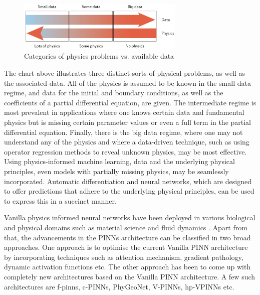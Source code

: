 \documentclass[conference,compsoc]{IEEEtran}
\begin{document}
\begin{figure}[h]
    \centering
    \includegraphics[scale=0.5,width = 8cm]{figures/data_vs_physics.JPG}
    \caption{Categories of physics problems vs. available data\cite{karniadakis2021physics}}
\end{figure}

The chart above illustrates three distinct sorts of physical problems, as well as the associated data\cite{karniadakis2021physics}.
All of the physics is assumed to be known in the small data regime, and data for the initial and boundary conditions, as well as the coefficients of a partial differential equation, are given.
The intermediate regime is most prevalent in applications where one knows certain data and fundamental physics but is missing certain parameter values or even a full term in the partial differential equation\cite{raissi2019physics}. Finally, there is the big data regime, where one may not understand any of the physics and where a data-driven technique, such as using operator regression methods to reveal unknown physics, may be most effective\cite{karniadakis2021physics}. Using physics-informed machine learning, data and the underlying physical principles, even models with partially missing physics, may be seamlessly incorporated\cite{cai2021physics}\cite{karniadakis2021physics}. Automatic differentiation and neural networks, which are designed to offer predictions that adhere to the underlying physical principles, can be used to express this in a succinct manner\cite{raissi2019physics}. 

Vanilla physics informed neural networks have been deployed in various biological and physical domains such as material science and fluid dynamics \cite{cai2021physics}\cite{tipireddy2019comparative}\cite{erichson2019physics}\cite{reyes2021learning}\cite{tartakovsky2020physics}. Apart from that, the advancements in the PINNs architecture can be classified in two broad approaches. One approach is to optimise the current Vanilla PINN architecture by incorporating techniques such as attention mechanism, gradient pathology\cite{wang2020understanding}\cite{hospedales2020meta}, dynamic activation functions etc\cite{jagtap2020locally}\cite{jagtap2020adaptive}\cite{elsken2019neural}. The other approach has been to come up with completely new architectures based on the Vanilla PINN architecture. A few such architectures are f-pinns\cite{pang2019fpinns}, c-PINNs, PhyGeoNet\cite{gao2021phygeonet}, V-PINNs, hp-VPINNs etc\cite{shukla2021parallel}.
\end{document}
